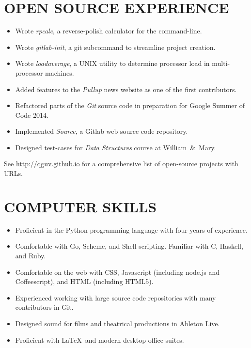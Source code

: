 \documentclass{res}
\begin{document}
\begin{resume}
\section{OPEN SOURCE EXPERIENCE}
\vspace{6mm}
\begin{itemize}[leftmargin=5mm]
\item Wrote \emph{rpcalc}, a reverse-polish calculator for the command-line.
\item Wrote \emph{gitlab-init}, a git subcommand to streamline project creation.
\item Wrote \emph{loadaverage}, a UNIX utility to determine processor load in multi-processor machines.
\item Added features to the \emph{Pullup} news website as one of the first contributors.
\item Refactored parts of the \emph{Git} source code in preparation for Google Summer of Code 2014.
\item Implemented \emph{Source}, a Gitlab web source code repository.
\item Designed test-cases for \emph{Data Structures} course at William~\&~Mary.
\end{itemize}
    \vspace{-3mm}
    See \url{http://qguv.github.io} for a comprehensive list of open-source projects with URLs.

\section{COMPUTER SKILLS}
\vspace{6mm}
\begin{itemize}[leftmargin=5mm]
\item Proficient in the Python programming language with four years of experience.
\item Comfortable with Go, Scheme, and Shell scripting. Familiar with C, Haskell, and Ruby.
\item Comfortable on the web with CSS, Javascript (including node.js and Coffeescript), and HTML (including HTML5).
\item Experienced working with large source code repositories with many contributors in Git.
\item Designed sound for films and theatrical productions in Ableton Live.
\item Proficient with \LaTeX~and modern desktop office suites.
\end{itemize}
 

\end{resume}
\end{document}
